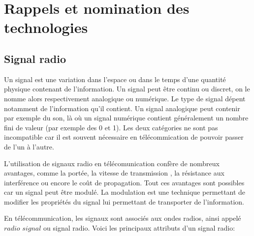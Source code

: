\renewcommand{\leftmark}{NOMINATION DES TECHNOLOGIES}

\chapter{Rappels et nomination des technologies}

\section{Signal radio}

Un signal est une variation dans l'espace ou dans le temps d'une quantité physique contenant de l'information. Un signal peut être continu ou discret, on le nomme alors respectivement analogique ou numérique. Le type de signal dépent notamment de l'information qu'il contient. Un signal analogique peut contenir par exemple du son, là où un signal numérique contient généralement un nombre fini de valeur (par exemple des 0 et 1).
Les deux catégories ne sont pas incompatible car il est souvent nécessaire en télécommication de pouvoir passer de l'un à l'autre.

\vspace{0.1cm}

L'utilisation de signaux radio en télécomunication confère de nombreux avantages, comme la portée, la vitesse de transmission , la résistance aux interférence ou encore le coût de propagation. Tout ces avantages sont possibles car un signal peut être modulé. La modulation est une technique permettant de modifier les propriétés du signal lui permettant de transporter de l'information.

\newpage

En télécommunication, les signaux sont associés aux ondes radios, ainsi appelé $radio$ $signal$ ou signal radio. Voici les principaux attributs d'un signal radio: 

\vspace{0.1cm}

